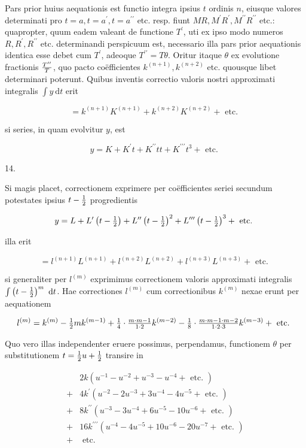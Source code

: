 \documentclass[twoside,12pt, showframe]{memoir}
\let\oldfrac\frac
\def\frac#1#2{\mathchoice{\tfrac{#1}{#2}}{\oldfrac{#1}{#2}}{\genfrac{}{}{}{2}{#1}{#2\mathstrut}}{\genfrac{}{}{}{3}{#1}{#2\mathstrut}}}
\begin{document}
Pars prior huius aequationis est functio integra ipsius \(t\) ordinis \(n\), eiusque valores determinati pro \(t=a, t=a^{\prime}, t=a^{\prime \prime}\) etc. resp. fiunt \(M R, M^{\prime} R^{\prime}, M^{\prime \prime} R^{\prime \prime}\) etc.: quapropter, quum eadem valeant de functione \(T^{\prime}\), uti ex ipso modo numeros \(R, R^{\prime}, R^{\prime \prime}\) etc. determinandi perspicuum est, necessario illa pars prior aequationis identica esse debet cum \(T^{\prime}\), adeoque \(T^{\prime \prime}=T \theta\). Oritur itaque \(\theta\) ex evolutione fractionis \(\frac{T^{\prime \prime}}{T}\), quo pacto coëfficientes \(k^{(n+1)}, k^{(n+2)}\) etc. quousque libet determinari poterunt. Quibus inventis correctio valoris nostri approximati integralis \(\int y \mathrm{~d} t\) erit

\[
=k^{(n+1)} K^{(n+1)}+k^{(n+2)} K^{(n+2)}+\text { etc. }
\]

si series, in quam evolvitur \(y\), est

\[
y=K+K^{\prime} t+K^{\prime \prime} t t+K^{\prime \prime \prime} t^{3}+\text { etc. }
\]

14.

Si magis placet, correctionem exprimere per coëfficientes seriei secundum potestates ipsius \(t-\frac{1}{2}\) progredientis

\[
y=L+L^{\prime}\left(t-\frac{1}{2}\right)+L^{\prime \prime}\left(t-\frac{1}{2}\right)^{2}+L^{\prime \prime \prime}\left(t-\frac{1}{2}\right)^{3}+\text { etc. }
\]

illa erit

\[
=l^{(n+1)} L^{(n+1)}+l^{(n+2)} L^{(n+2)}+l^{(n+3)} L^{(n+3)}+\text { etc. }
\]

si generaliter per \(l^{(m)}\) exprimimus correctionem valoris approximati integralis \(\int\left(t-\frac{1}{2}\right)^{m} \mathrm{~d} t\). Hae correctiones \(l^{(m)}\) cum correctionibus \(k^{(m)}\) nexae erunt per aequationem

\[
l^{(m)}=k^{(m)}-\frac{1}{2} m k^{(m-1)}+\frac{1}{4} \cdot \frac{m \cdot m-1}{1 \cdot 2} k^{(m-2)}-\frac{1}{8} \cdot \frac{m \cdot m-1 \cdot m-2}{1 \cdot 2 \cdot 3} k^{(m-3)}+\text { etc. }
\]

Quo vero illas independenter eruere possimus, perpendamus, functionem \(\theta\) per substitutionem \(t=\frac{1}{2} u+\frac{1}{2}\) transire in

\[
\begin{aligned}
& 2 k\left(u^{-1}-u^{-2}+u^{-3}-u^{-4}+\text { etc. }\right) \\
+ & 4 k^{\prime}\left(u^{-2}-2 u^{-3}+3 u^{-4}-4 u^{-5}+\text { etc. }\right) \\
+ & 8 k^{\prime \prime}\left(u^{-3}-3 u^{-4}+6 u^{-5}-10 u^{-6}+\text { etc. }\right) \\
+ & 16 k^{\prime \prime \prime}\left(u^{-4}-4 u^{-5}+10 u^{-6}-20 u^{-7}+\text { etc. }\right) \\
+ & \text { etc. }
\end{aligned}
\]
\end{document}

